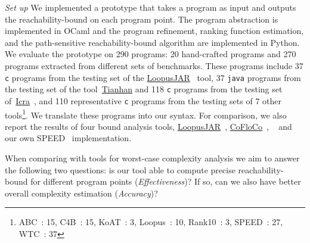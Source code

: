 \emph{Set up} We implemented a prototype {\PSRB} that takes a program as input 
and outputs the reachability-bound on each program point.
The 
program abstraction is implemented in OCaml and the program refinement, ranking function estimation, and the path-sensitive reachability-bound algorithm are implemented in Python.
We evaluate the prototype on 290 programs: 20 hand-crafted programs and 270 programs extracted from different sets of benchmarks. 
These programs include  37 {\tt c} programs 
from the testing set of the \hyperlink{https://forsyte.at/static/people/sinn/loopusJAR/index.html}{LoopusJAR}~\cite{BenchmarkLoopus} tool,
37 {\tt java} programs from the testing set of the tool~\hyperlink{https://zenodo.org/record/5140586\#.Y5pBoC-B1QI}{Tianhan}\cite{BenchmarkTianhan,LuCT21} 
and 118 {\tt c} programs from the testing set of~\hyperlink{https://github.com/icra-team/icra}{Icra}~\cite{BenchmarkIcra,KincaidBCR19,CyphertBKR19}, and 110 representative {\tt c} programs from the testing sets of 7 other tools\footnote{ABC~\cite{BenchmarkABC}: 15, C4B~\cite{BenchmarkC4B}: 15, KoAT~\cite{BenchmarkKoAt}: 3, Loopus~\cite{BenchmarkLoopus}: 10, Rank10~\cite{BenchmarkRank}: 3, SPEED~\cite{GulwaniJK09,GulwaniZ10,GulwaniMC09}: 27, WTC~\cite{BenchmarkLoopus}: 37}.
%
We translate these programs into our syntax.
For comparison, we also report the results of four bound analysis tools, 
\hyperlink{https://forsyte.at/software/loopus/}{LoopusJAR}~\cite{SinnZV17},
\hyperlink{https://github.com/aeflores/CoFloCo/tree/master/src}{CoFloCo}~\cite{ToolCofloco},
~\cite{BenchmarkTianhan}
and our own SPEED~\cite{GulwaniJK09} implementation.

When comparing with tools for worst-case
complexity analysis we aim to answer the following two questions: is our tool able to compute precise reachability-bound for different program points (\emph{Effectiveness})? If so, can we also have better overall complexity estimation (\emph{Accuracy})?


